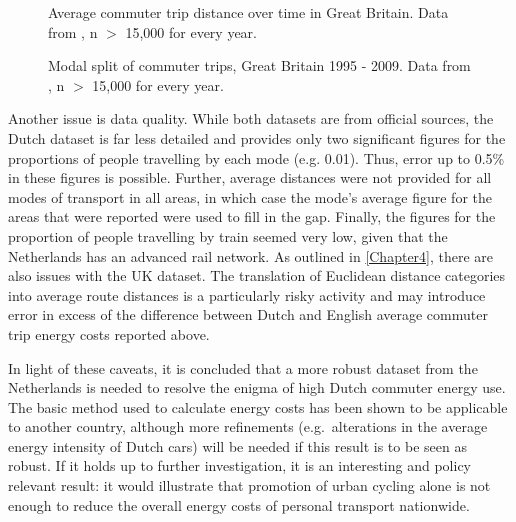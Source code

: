 \begin{figure}
 \caption[Average commuter trip distance over time in Great Britain]
 {Average commuter trip distance over time in Great Britain. Data from
 \citet[table 9]{DfT2011-commuting}, n $>$ 15,000 for every year.} \label{fcommuterdistime}
\end{figure}

\begin{figure}
 \caption[Modal split of commuter trips, Great Britain 1995 - 2009]
 {Modal split of commuter trips, Great Britain 1995 - 2009. Data from
 \citet[table 9]{DfT2011-commuting}, n $>$ 15,000 for every year.} \label{fmode-time-dft2011}
\end{figure}

Another issue is data quality. While both datasets
are from official sources, the Dutch dataset is far less detailed and provides
only two significant figures for the proportions of people travelling by each
mode (e.g. 0.01). Thus, error up to 0.5\% in these figures is possible.
Further, average distances were not provided for all modes of transport in all
areas, in which case the mode's average figure for the areas that were reported
were used to fill in the gap. Finally, the figures for the proportion of people
travelling by train seemed very low, given that the Netherlands has an
advanced rail network. As outlined in \cref{Chapter4}, %
there are also issues with the UK dataset. The translation of
Euclidean distance
categories into average route distances is a particularly risky
activity and may introduce error in excess of the difference between
Dutch and English average commuter trip energy costs reported above.

In light of these caveats, it is concluded that a 
more robust dataset from the Netherlands is needed to resolve the
enigma of high Dutch commuter energy use. The basic method used to calculate
energy costs has been shown to be applicable to another country,
although more refinements (e.g.~alterations in the average energy
intensity of Dutch cars) will be needed if this result is to be
seen as robust. If it holds up to further investigation, it is an interesting
and policy relevant result: it would illustrate that promotion of urban
cycling alone is not enough to reduce the overall energy costs of personal
transport nationwide.


